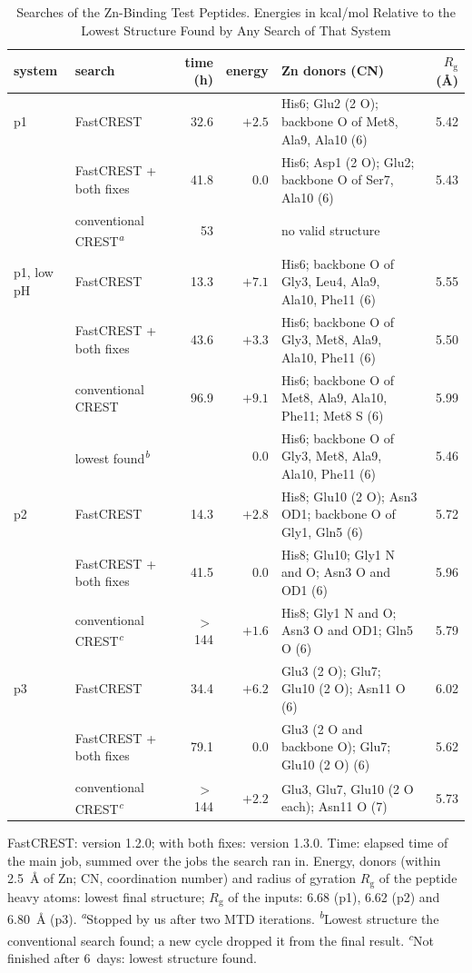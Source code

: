 \documentclass[journal=jctcce,manuscript=suppinfo]{achemso}
\begin{document}
\begin{table}[tbp]
\caption{Searches of the Zn-Binding Test Peptides. Energies in kcal/mol Relative to the Lowest Structure Found by Any
Search of That System}
\label{tab:si-zn}
\small
\setlength{\tabcolsep}{4pt}
\begin{tabular}{@{}L{0.10\textwidth}L{0.235\textwidth}rrL{0.37\textwidth}r@{}}
\toprule
system & search & time (h) & energy & Zn donors (CN) & $R_\mathrm{g}$ (\AA) \\
\midrule
p1 & FastCREST & 32.6 & $+2.5$ & His6; Glu2 (2 O); backbone O of Met8, Ala9, Ala10 (6) & 5.42 \\
 & FastCREST + both fixes & 41.8 & 0.0 & His6; Asp1 (2 O); Glu2; backbone O of Ser7, Ala10 (6) & 5.43 \\
 & conventional CREST\textsuperscript{\emph{a}} & 53 & & no valid structure & \\
p1, low pH & FastCREST & 13.3 & $+7.1$ & His6; backbone O of Gly3, Leu4, Ala9, Ala10, Phe11 (6) & 5.55 \\
 & FastCREST + both fixes & 43.6 & $+3.3$ & His6; backbone O of Gly3, Met8, Ala9, Ala10, Phe11 (6) & 5.50 \\
 & conventional CREST & 96.9 & $+9.1$ & His6; backbone O of Met8, Ala9, Ala10, Phe11; Met8 S (6) & 5.99 \\
 & \quad lowest found\textsuperscript{\emph{b}} & & 0.0 & His6; backbone O of Gly3, Met8, Ala9, Ala10, Phe11 (6) & 5.46 \\
p2 & FastCREST & 14.3 & $+2.8$ & His8; Glu10 (2 O); Asn3 OD1; backbone O of Gly1, Gln5 (6) & 5.72 \\
 & FastCREST + both fixes & 41.5 & 0.0 & His8; Glu10; Gly1 N and O; Asn3 O and OD1 (6) & 5.96 \\
 & conventional CREST\textsuperscript{\emph{c}} & $>$144 & $+1.6$ & His8; Gly1 N and O; Asn3 O and OD1; Gln5 O (6) & 5.79 \\
p3 & FastCREST & 34.4 & $+6.2$ & Glu3 (2 O); Glu7; Glu10 (2 O); Asn11 O (6) & 6.02 \\
 & FastCREST + both fixes & 79.1 & 0.0 & Glu3 (2 O and backbone O); Glu7; Glu10 (2 O) (6) & 5.62 \\
 & conventional CREST\textsuperscript{\emph{c}} & $>$144 & $+2.2$ & Glu3, Glu7, Glu10 (2 O each); Asn11 O (7) & 5.73 \\
\bottomrule
\end{tabular}

\smallskip
\begin{minipage}{\textwidth}\raggedright\footnotesize
FastCREST: version 1.2.0; with both fixes: version 1.3.0. Time: elapsed time of the main job, summed over the jobs the
search ran in. Energy, donors (within 2.5~\AA{} of Zn; CN, coordination number) and radius of gyration $R_\mathrm{g}$ of
the peptide heavy atoms: lowest final structure; $R_\mathrm{g}$ of the inputs: 6.68 (p1), 6.62 (p2) and 6.80~\AA{} (p3).
\textsuperscript{\emph{a}}Stopped by us after two MTD iterations. \textsuperscript{\emph{b}}Lowest structure the
conventional search found; a new cycle dropped it from the final result. \textsuperscript{\emph{c}}Not finished after
6~days: lowest structure found.
\end{minipage}
\end{table}
\end{document}

